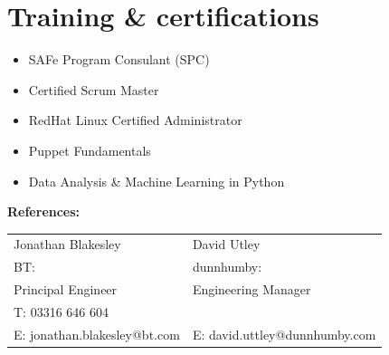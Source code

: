 \documentclass[]{cv-style}          %
\begin{document}
\section{Training \& certifications}
  \vspace{-0.2cm}
\begin{itemize}
  \item{SAFe Program Consulant (SPC)}
  \item{Certified Scrum Master}
  \item{RedHat Linux Certified Administrator}
  \item{Puppet Fundamentals}
  \item{Data Analysis \& Machine Learning in Python}
\end{itemize}



\textbf{References:}\\
\begin{center}
  \begin{tabular}{ |l|l| }
    \hline
    Jonathan Blakesley & David Utley \\
    BT: & dunnhumby:\\
    Principal Engineer & Engineering Manager \\
    T: 03316 646 604 & \\
    E: jonathan.blakesley@bt.com & E: david.uttley@dunnhumby.com \\
    \hline
  \end{tabular}
\end{center}
\end{document}

